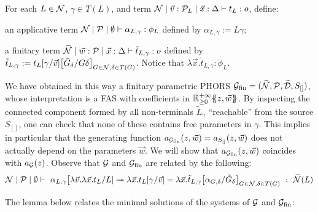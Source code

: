 For each $L\in \mathcal{N}$, $\gamma\in T(L)$,
and term $\mathcal{N}\mid \vec v:\mathcal{P}_L\mid\vec x:\Delta\vdash t_L:o$,
 define:
\begin{varitemize}
\item an applicative term $\mathcal{N}\mid\mathcal{P}\mid\emptyset \vdash \alpha_{L,\gamma}:\phi_L$ defined by 
$\alpha_{L,\gamma}:=L\gamma$;

\item a finitary term $\widetilde{\mathcal{N}}\mid\vec w:\mathcal{P} \mid\vec x:\Delta\vdash \tilde{t}_{L,\gamma}:o$ defined by 
$\tilde t_{L,\gamma}:=  t_{L}[\gamma/\vec v]\big[ \tilde G_{\delta}/G\delta\big]_{G\in \mathcal{N}, \delta\in T(G)}$.
Notice that $\lambda \vec x.\tilde t_{L,\gamma}:\phi_L$.
\end{varitemize}


We have obtained in this way a finitary parametric PHORS $\mathcal{G}_{\mathrm{fin}}=(\widetilde{\mathcal{N}}, \mathcal{P}, \widetilde{\mathcal{D}},S_{[]})$,
whose interpretation is a FAS with coefficients in ${\mathbb{R}^{+\infty}_{\geq 0}}\{\!\!\{z,\vec w\}\!\!\}$. 
By inspecting the connected component formed by all non-terminals $\tilde L_{\gamma}$
``reachable'' from the source $S_{[]}$, one can check that none of these contains free parameters in $\gamma$. 
This implies in particular that the generating function $a_{\mathcal{G}_{\mathrm{fin}}}(z,\vec w)=a_{S_{[]}}(z,\vec w)$ does not actually depend on the parameters $\vec w$. We will show that $a_{\mathcal{G}_{\mathrm{fin}}}(z,\vec w)$ coincides with $a_{\mathcal{G}}(z)$.
Observe that $\mathcal{G}$ and $\mathcal{G}_{\mathrm{fin}}$ are related by the following:
\begin{equation}\label{eq:alphaeq}
\mathcal{N}\mid\mathcal{P}\mid\emptyset\vdash \ \alpha_{L,\gamma}\big[ \lambda \vec v.\lambda \vec x.t_L/  L] \stackrel{}{\twoheadrightarrow}{} \lambda \vec x.t_{L}[\gamma/\vec v]   =\lambda \vec x.
\tilde{t}_{L,\gamma}\big[\alpha_{G,\delta}/\tilde{G}_\delta\big]_{G\in \mathcal{N},\delta\in T(G)} 
\ : \ \widetilde{\mathcal{N}}(L)
\end{equation}


The lemma below relates the minimal solutions of the systems of $\mathcal{G}$ and $\mathcal{G}_{\mathrm{fin}}$:

